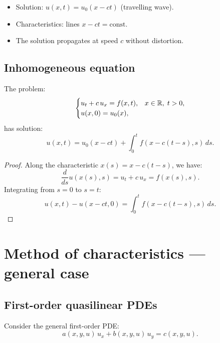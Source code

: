 \begin{keyformulas}[title=\textbf{Transport equation --- key formulas}]
\begin{itemize}
    \item Solution: $u(x,t) = u_0(x - ct)$ (travelling wave).
    \item Characteristics: lines $x - ct = \mathrm{const}$.
    \item The solution propagates at speed $c$ without distortion.
\end{itemize}
\end{keyformulas}

\subsection{Inhomogeneous equation}

\begin{theorem}
The problem:
\begin{equation}\label{eq:transport_source}
    \begin{cases}
        u_t + c\, u_x = f(x,t), & x \in \mathbb{R},\; t > 0,\\
        u(x,0) = u_0(x),
    \end{cases}
\end{equation}
has solution:
\begin{equation}\label{eq:transport_source_sol}
    u(x,t) = u_0(x-ct) + \int_0^t f(x - c(t-s), s)\, ds.
\end{equation}
\end{theorem}

\begin{proof}
Along the characteristic $x(s) = x - c(t-s)$, we have:
\[
    \frac{d}{ds}u(x(s),s) = u_t + c\, u_x = f(x(s),s).
\]
Integrating from $s=0$ to $s=t$:
\[
    u(x,t) - u(x-ct, 0) = \int_0^t f(x - c(t-s), s)\, ds.
\]
\end{proof}

\section{Method of characteristics --- general case}

\subsection{First-order quasilinear PDEs}

Consider the general first-order PDE:
\begin{equation}\label{eq:quasilinear}
    a(x,y,u)\, u_x + b(x,y,u)\, u_y = c(x,y,u).
\end{equation}


